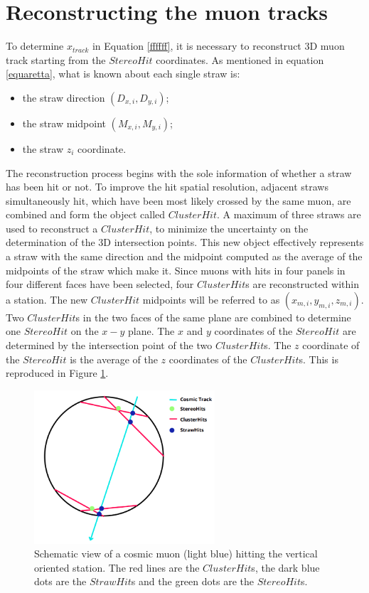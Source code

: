\section{Reconstructing the muon tracks}\label{reconstruction}
To determine $x_{track}$ in Equation \ref{ffffff}, 
it is necessary to reconstruct 3D muon track 
starting from the $StereoHit$ coordinates.
As mentioned in equation \ref{equaretta}, 
what is known about each single straw is:
\begin{itemize}
    \item the straw direction $(D_{x,i},D_{y,i})$;
    \item the straw midpoint $(M_{x,i},M_{y,i})$;
    \item the straw $z_i$ coordinate.
\end{itemize} 
The reconstruction process begins 
with the sole information of whether 
a straw has been hit or not.
To improve the hit spatial resolution, adjacent 
straws simultaneously hit, which have been most 
likely crossed by the same muon, are combined 
and form the object called $ClusterHit$. 
A maximum of three straws are used to reconstruct a 
$ClusterHit$, to minimize the uncertainty on 
the determination of the 3D intersection points.
This new object effectively represents a 
straw with the same direction and the midpoint 
computed as the average of the midpoints of the straw 
which make it. Since muons with hits in four panels in four different 
faces have been selected, four $ClusterHit$s are reconstructed 
within a station. The new $ClusterHit$ 
midpoints will be referred to as 
$(x_{m,i}, y_{m,i}, z_{m,i})$.
Two $ClusterHit$s in the two faces of the same 
plane are combined to determine one $StereoHit$ on 
the $x-y$ plane. 
The $x$ and $y$ coordinates of the 
$StereoHit$ are determined by the 
intersection point of the two 
$ClusterHit$s. The $z$ coordinate of 
the $StereoHit$ is the average of the 
$z$ coordinates of the $ClusterHit$s.
This is reproduced in Figure \ref{fig:stco}.
\begin{figure}[!h]
    \centering
    \includegraphics[width =0.6\textwidth]{figures/png/Screenshot_20240810_210144.png}
    \caption[Schematic view of a cosmic muon hitting the vertical oriented station.]{Schematic view of a cosmic muon (light blue) hitting the vertical oriented station. The red lines are the $ClusterHit$s, the dark blue dots 
    are the $StrawHit$s and the green dots are the $StereoHit$s.}
    \label{fig:stco}
\end{figure}
